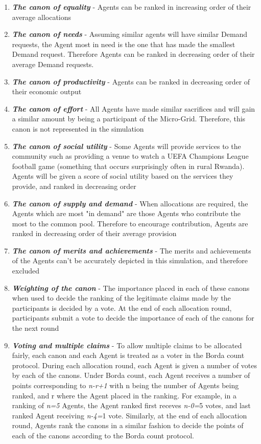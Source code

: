 \begin{enumerate}
	\item \textbf{\textit{The canon of equality}} - Agents can be ranked in increasing order of their average allocations
	\item \textbf{\textit{The canon of needs}} - Assuming similar agents will have similar Demand requests, the Agent most in need is the one that has made the smallest Demand request. Therefore Agents can be ranked in decreasing order of their average Demand requests.
	\item \textbf{\textit{The canon of productivity}} - Agents can be ranked in decreasing order of their economic output
	\item \textbf{\textit{The canon of effort}} - All Agents have made similar sacrifices and will gain a similar amount by being a participant of the Micro-Grid. Therefore, this canon is not represented in the simulation
	\item \textbf{\textit{The canon of social utility}} - Some Agents will provide services to the community such as providing a venue to watch a UEFA Champions League football game (something that occurs surprisingly often in rural Rwanda). Agents will be given a score of social utility based on the services they provide, and ranked in decreasing order
	\item \textbf{\textit{The canon of supply and demand}} - When allocations are required, the Agents which are most "in demand" are those Agents who contribute the most to the common pool. Therefore to encourage contribution, Agents are ranked in decreasing order of their average provision
	\item \textbf{\textit{The canon of merits and achievements}} - The merits and achievements of the Agents can't be accurately depicted in this simulation, and therefore excluded
	\item \textbf{\textit{Weighting of the canon}} - The importance placed in each of these canons when used to decide the ranking of the legitimate claims made by the participants is decided by a vote. At the end of each allocation round, participants submit a vote to decide the importance of each of the canons for the next round
	\item \textbf{\textit{Voting and multiple claims}} - To allow multiple claims to be allocated fairly, each canon and each Agent is treated as a voter in the Borda count protocol. During each allocation round, each Agent is given a number of votes by each of the canons. Under Borda count, each Agent receives a number of points corresponding to \textit{n-r+1} with n being the number of Agents being ranked, and r where the Agent placed in the ranking. For example, in a ranking of \textit{n=5} Agents, the Agent ranked first receves \textit{n-0=}5 votes, and last ranked Agent receiving \textit{n-4=}1 vote. Similarly, at the end of each allocation round, Agents rank the canons in a similar fashion to decide the points of each of the canons according to the Borda count protocol.
\end{enumerate}


